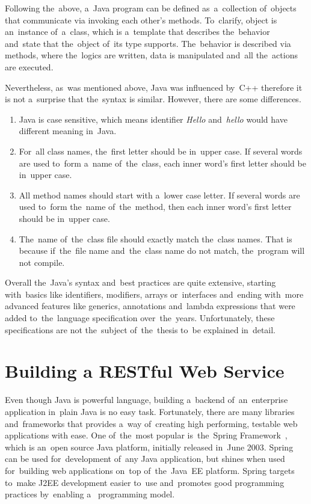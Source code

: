 Following the~above, a~Java program can be defined as~a~collection of~objects
that communicate via invoking each other's methods. To~clarify, object is
an~instance of~a~class, which is a~template that describes the~behavior
and~state that the~object of~its type supports. The~behavior is described via
methods, where the~logics are written, data is manipulated and~all the~actions
are executed.

Nevertheless, as~was mentioned above, Java was influenced by~C++ therefore it is
not a~surprise that the~syntax is similar. However, there are some differences.

\begin{enumerate}
  \item Java is case sensitive, which means identifier \textit{Hello}
  and~\textit{hello} would have different meaning in~Java.
  \item For~all class names, the~first letter should be in~upper case. If
  several words are used to~form a~name of~the~class, each inner word's first
  letter should be in~upper case.
  \item All method names should start with a~lower case letter. If several words
  are used to~form the~name of~the~method, then each inner word's first letter
  should be in~upper case.
  \item The~name of~the~class file should exactly match the~class names. That is
  because if~the~file name and~the~class name do not match, the~program will not
  compile.
\end{enumerate}

Overall the~Java's syntax and~best practices are quite extensive, starting
with~basics like identifiers, modifiers, arrays or~interfaces and~ending
with~more advanced features like generics, annotations and~lambda expressions
that were added to~the~language specification over~the~years. Unfortunately,
these specifications are not the~subject of~the~thesis to~be explained
in~detail.



\section{Building a RESTful Web Service}
Even though Java is powerful language, building a~backend of~an~enterprise
application in~plain Java is no easy task. Fortunately, there are many libraries
and~frameworks that provides a~way of~creating high performing, testable web
applications with ease. One of~the~most popular is~the~Spring
Framework~\cite{Spring}, which is an~open source Java platform, initially
released in~June 2003. Spring can be used for~development of~any Java
application, but shines when used for~building web applications on~top
of~the~Java~EE platform. Spring targets to~make J2EE development easier to~use
and~promotes good programming practices by~enabling
a~ programming model.



